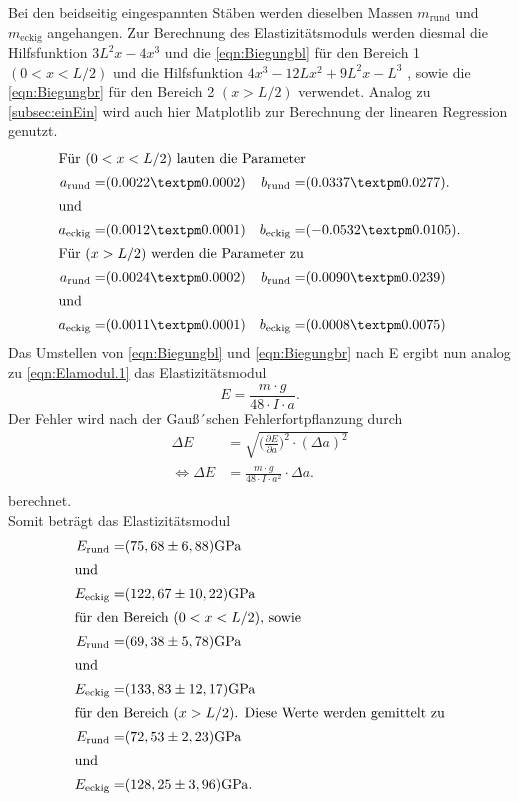 \noindent Bei den beidseitig eingespannten Stäben werden dieselben Massen $m_{\text{rund}}$ und $m_{\text{eckig}}$ angehangen.
Zur Berechnung des Elastizitätsmoduls werden diesmal die Hilfsfunktion $3L^2x - 4x^3$ und die \autoref{eqn:Biegungbl} für den Bereich 1 $(0<x<L/2)$ und die Hilfsfunktion $4x^3-12Lx^2+9L^2x-L^3$ , sowie die \autoref{eqn:Biegungbr} für den Bereich 2 $(x>L/2)$
verwendet. Analog zu \autoref{subsec:einEin} wird auch hier Matplotlib zur Berechnung der linearen Regression genutzt.
\begin{align*}
  \intertext{Für $(0<x<L/2)$ lauten die Parameter}
  a_{\text{rund}} =&(0.0022 ± 0.0002) & b_{\text{rund}}=& (0.0337 ± 0.0277).\\
  \shortintertext{und}
  a_{\text{eckig}} =&(0.0012 ± 0.0001) & b_{\text{eckig}}=& (-0.0532 ± 0.0105).\\
  \intertext{Für $(x>L/2)$ werden die Parameter zu}
  a_{\text{rund}} =&(0.0024 ± 0.0002) & b_{\text{rund}}=& (0.0090 ± 0.0239)\\
  \shortintertext{und}
  a_{\text{eckig}} =&(0.0011 ± 0.0001) & b_{\text{eckig}}=& (0.0008 ± 0.0075)\\
 \end{align*}
Das Umstellen von \autoref{eqn:Biegungbl} und \autoref{eqn:Biegungbr} nach E ergibt nun analog zu \autoref{eqn:Elamodul.1} das Elastizitätsmodul
 \begin{equation*}
  E = \frac{m\cdot g}{48\cdot I \cdot a}.
  \label{eqn:e-ein}
  \end{equation*}
Der Fehler wird nach der Gauß´schen Fehlerfortpflanzung durch
\begin{equation*}
  \begin{aligned}
  \Delta E &= \sqrt{\biggl(\frac{\partial E}{\partial a}\biggr)^2\cdot (\Delta a)^2} \\
  \iff \Delta E &= \frac{m\cdot g}{48\cdot I \cdot a^2} \cdot \Delta a.\\
  \label{eqn:e-fehler-beid}
  \end{aligned}
  \end{equation*}
berechnet.\\
Somit beträgt das Elastizitätsmodul
\begin{align*}
  E_{\text{rund}}=&(75,68\pm6,88)\si{\giga\pascal}\\
  \shortintertext{und}
  E_{\text{eckig}}=&(122,67\pm10,22)\si{\giga\pascal}\\
  \intertext{für den Bereich $(0<x<L/2)$, sowie}
  E_{\text{rund}}=&(69,38\pm5,78)\si{\giga\pascal}\\
  \shortintertext{und}
  E_{\text{eckig}}=&(133,83\pm12,17)\si{\giga\pascal}\\
  \intertext{für den Bereich $(x>L/2)$. Diese Werte werden gemittelt zu}
  E_{\text{rund}}=&(72,53\pm2,23)\si{\giga\pascal}\\
  \intertext{und}
  E_{\text{eckig}}=&(128,25\pm3,96)\si{\giga\pascal}.
  \label{eqn:Ebeid} 
\end{align*}